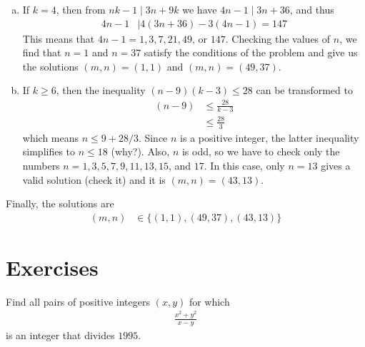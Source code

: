 \documentclass{subfile}
\begin{document}
\begin{solution}
\begin{enumerate}[(a)]
				\item If $k=4$, then from $nk-1\mid 3n+9k$ we have $4n-1\mid 3n+36$, and thus
					\begin{align*}
						4n-1
							& \mid 4(3n+36)-3(4n-1)=147
					\end{align*}
				This means that $4n-1=1, 3, 7, 21, 49$, or $147$. Checking the values of $n$, we find that $n=1$ and $n=37$ satisfy the conditions of the problem and give us the solutions $(m,n)=(1,1)$ and $(m,n)=(49,37)$.

				\item If $k\geq 6$, then the inequality $(n-9)(k-3) \leq 28$ can be transformed to
					\begin{align*}
						(n-9)
							& \leq \frac{28}{k-3}\\
							& \leq \frac{28}{3}
					\end{align*}
				which means $n\leq 9+28/3$. Since $n$ is a positive integer, the latter inequality simplifies to $n \leq 18$ (why?). Also, $n$ is odd, so we have to check only the numbers $n=1, 3, 5, 7, 9, 11, 13, 15$, and $17$. In this case, only $n=13$ gives a valid solution (check it) and it is $(m,n)=(43,13)$.
			\end{enumerate}
		Finally, the solutions are
			\begin{align*}
				(m,n)
					& \in\{(1,1), (49,37), (43,13)\}
			\end{align*}
	\end{solution}
\newpage
\section{Exercises}


	\begin{problem}
		Find all pairs of positive integers $(x, y)$ for which
			\begin{align*}
				\frac{x^2+y^2}{x-y}
			\end{align*}
		is an integer that divides $1995$.
	\end{problem}

%
\end{document}
